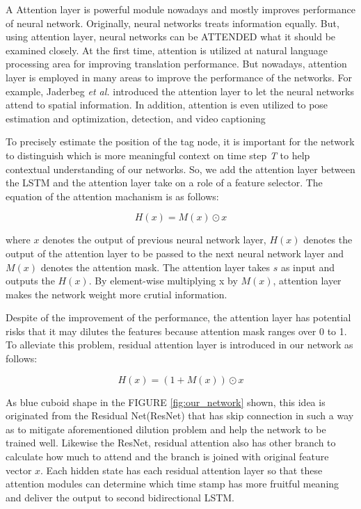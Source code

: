 \documentclass{ieeeaccess}
\begin{document}
A Attention layer is powerful module nowadays and mostly improves performance of neural network. Originally, neural networks treats information equally. But, using attention layer, neural networks can be ATTENDED what it should be examined closely. At the first time, attention is utilized at natural language processing area for improving translation performance\cite{luong2015effective}. But nowadays, attention layer is employed in many areas to improve the performance of the networks. For example, Jaderbeg \textit{et al.}\cite{jaderberg2015spatial} introduced the attention layer to let the neural networks attend to spatial information. In addition, attention is even utilized to pose estimation and optimization\cite{parisotto2018global}, detection\cite{zhu2018towards}, and video captioning\cite{xu2017learning} 

To precisely estimate the position of the tag node, it is important for the network to distinguish which is more meaningful context on time step \textit{T} to help contextual understanding of our  networks. So, we add the attention layer between the LSTM and the attention layer take on a role of a feature selector\cite{wang2017residual}. The equation of the attention machanism is as follows:  

\begin{equation}
H(x)=M(x)\odot x
\end{equation} 

where $x$ denotes the output of previous neural network layer, $H(x)$ denotes the output of the attention layer to be passed to the next neural network layer and $M(x)$ denotes the attention mask.  The attention layer takes $s$ as input and outputs the $H(x)$. By element-wise multiplying x by $M(x)$, attention layer makes the network weight more crutial information. 

Despite of the improvement of the performance, the attention layer has potential risks that it may dilutes the features because attention mask ranges over 0 to 1. To alleviate this problem, residual attention layer is introduced in our network as follows\cite{wang2017residual}:

\begin{equation}
H(x)=\left(1+M(x)\right)\odot x
\end{equation} 

As blue cuboid shape in the FIGURE \ref{fig:our_network} shown, this idea is originated from the Residual Net(ResNet)\cite{he2016deep} that has skip connection in such a way as to mitigate aforementioned dilution problem and help the network to be trained well. Likewise the ResNet, residual attention also has other branch to calculate how much to attend and the branch is joined with original feature vector $x$. Each hidden state has each residual attention layer so that these attention modules can determine which time stamp has more fruitful meaning and deliver the output to second bidirectional LSTM.
\end{document}
